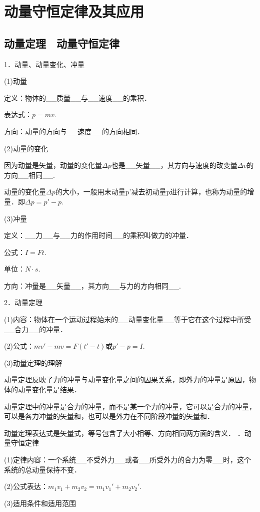 \chapter{动量守恒定律及其应用}
\section{动量定理　动量守恒定律}


1．动量、动量变化、冲量

(1)动量

定义：物体的\_\_质量\_\_与\_\_速度\_\_的乘积．

表达式：$p=mv$.

方向：动量的方向与\_\_速度\_\_的方向相同．

(2)动量的变化

因为动量是矢量，动量的变化量$\Delta p$也是\_\_矢量\_\_，其方向与速度的改变量$\Delta v$的方向\_\_相同\_\_.

动量的变化量$\Delta p$的大小，一般用末动量p'减去初动量p进行计算，也称为动量的增量．即$Δp=p'-p$.

(3)冲量

定义：\_\_力\_\_与\_\_力的作用时间\_\_的乘积叫做力的冲量．

公式：$I=Ft$.

单位：$N\cdot s$.

方向：冲量是\_\_矢量\_\_，其方向\_\_与力的方向相同\_\_.

2．动量定理

(1)内容：物体在一个运动过程始末的\_\_动量变化量\_\_等于它在这个过程中所受\_\_合力\_\_的冲量．

(2)公式：$mv'-mv=F(t'-t)$或$p'-p=I$.

(3)动量定理的理解

动量定理反映了力的冲量与动量变化量之间的因果关系，即外力的冲量是原因，物体的动量变化量是结果．

动量定理中的冲量是合力的冲量，而不是某一个力的冲量，它可以是合力的冲量，可以是各力冲量的矢量和，也可以是外力在不同阶段冲量的矢量和．

动量定理表达式是矢量式，等号包含了大小相等、方向相同两方面的含义．
．动量守恒定律

(1)定律内容：一个系统\_\_不受外力\_\_或者\_\_所受外力的合力为零\_\_时，这个系统的总动量保持不变．

(2)公式表达：$m_1v_1+m_2v_2=m_1v_1'+m_2v_2'$.

(3)适用条件和适用范围

